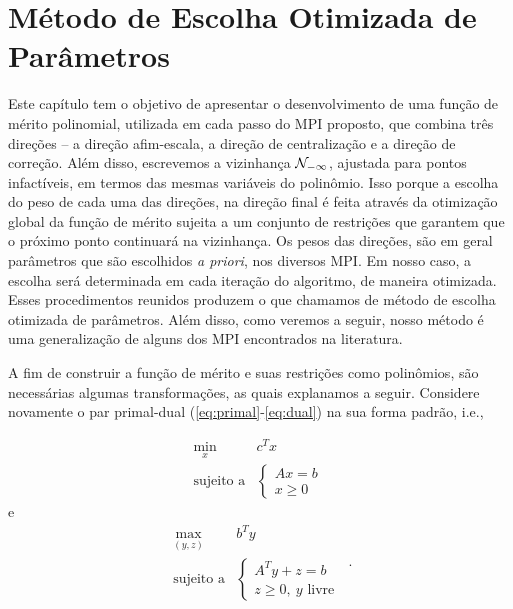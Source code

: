 





	\chapter{Método de Escolha Otimizada de Parâmetros}
\label{chap:merit-function}


Este capítulo tem o objetivo de apresentar o desenvolvimento de uma função de mérito polinomial,  utilizada em cada passo do \acl{MPI} proposto,  que combina três direções -- a direção afim-escala, a direção de centralização e a direção de correção. Além disso, escrevemos a vizinhança $\mathcal{N}_{-\infty}$, ajustada para pontos infactíveis, em termos das mesmas variáveis do polinômio. Isso porque a escolha do peso de cada uma das direções,  na direção final é feita através da  otimização global da função de mérito sujeita a um conjunto de restrições que garantem que o próximo ponto continuará na vizinhança. Os pesos das direções, são em geral parâmetros que são escolhidos  \emph{a priori}, nos diversos \ac{MPI}.  Em nosso caso, a escolha será determinada em cada iteração do algoritmo, de maneira otimizada.  Esses procedimentos reunidos produzem o que chamamos de   método de escolha otimizada de parâmetros. Além disso, como veremos a seguir,  nosso método é uma generalização de alguns dos \ac{MPI} encontrados na literatura. 



 
A fim de construir a função de mérito e suas restrições como polinômios, são necessárias algumas transformações, as quais explanamos a seguir. Considere novamente o par primal-dual  (\ref{eq:primal}-\ref{eq:dual}) na sua forma padrão,
i.e.,  

 \begin{equation*}
	\begin{array}{lc}
\displaystyle \min_{x} & c^Tx \\
\text{sujeito a} &\begin{cases} Ax = b \\
				 x \geq 0	
				 \end{cases}\
\end{array}\tag{$P$}
\end{equation*}
e 
 \begin{equation}
	\begin{array}{lc}
\displaystyle \max_{(y,z)} & b^Ty \\
\text{sujeito a} &\begin{cases} A^Ty + z = b \\
				 z \geq 0, \:y \text{ livre}	
				 \end{cases}\
\end{array}.
\tag{$D$}
\end{equation}

